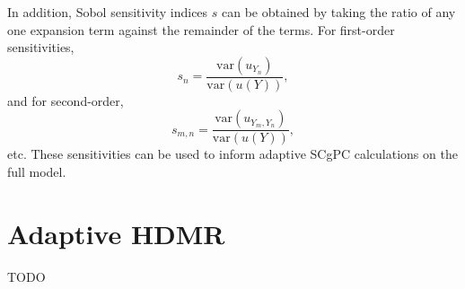 In addition, Sobol sensitivity indices $s$ can be obtained by taking the ratio of any one expansion term against
the remainder of the terms.  For first-order sensitivities,
\begin{equation}
  s_n = \frac{\text{var}(u_{Y_n})}{\text{var}(u(Y))},
\end{equation}
and for second-order,
\begin{equation}
  s_{m,n} = \frac{\text{var}(u_{Y_m,Y_n})}{\text{var}(u(Y))},
\end{equation}
etc.  These sensitivities can be used to inform adaptive SCgPC calculations on the full model.

\section{Adaptive HDMR}
TODO
